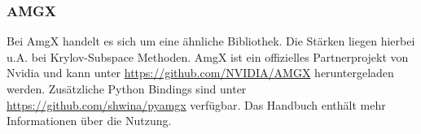 			\subsubsection{AMGX}	
			Bei AmgX handelt es sich um eine ähnliche Bibliothek. Die Stärken liegen hierbei u.A. bei Krylov-Subspace Methoden. AmgX ist ein offizielles Partnerprojekt von Nvidia und kann unter \url{https://github.com/NVIDIA/AMGX} heruntergeladen werden. Zusätzliche Python Bindings sind unter \url{https://github.com/shwina/pyamgx} verfügbar. Das Handbuch enthält mehr Informationen über die Nutzung. \autocite{amgx}	
			